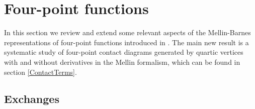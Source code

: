 \documentclass[11pt,a4paper]{article}
\begin{document}
\section{Four-point functions}
\label{sec::4ptfunc}

In this section we review and extend some relevant aspects of the Mellin-Barnes representations of four-point functions introduced in \cite{Sleight:2019mgd,Sleight:2019hfp}. The main new result is a systematic study of four-point contact diagrams generated by quartic vertices with and without derivatives in the Mellin formalism, which can be found in section \ref{ContactTerms}.


\subsection{Exchanges}
\label{sec::4ptexch}
\end{document}
